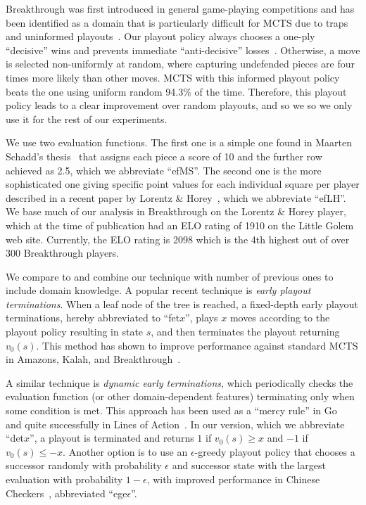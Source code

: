 \documentclass[conference]{IEEEtran}
\begin{document}
Breakthrough was first introduced in general game-playing competitions and has been identified as a domain 
that is particularly difficult for MCTS due to traps and uninformed playouts~\cite{Gudmindsson13Sufficiency}. 
Our playout policy always chooses a one-ply ``decisive'' wins and prevents immediate ``anti-decisive'' 
losses~\cite{Teytaud10On}.
Otherwise, a move is selected non-uniformly at random, where capturing undefended pieces are four times more
likely than other moves. 
MCTS with this informed playout policy beats the one using uniform random 94.3\% of the time. Therefore, this 
playout policy leads to a clear improvement over random playouts, and so we so we only use it for the rest 
of our experiments. 

We use two evaluation functions. The first one is a simple one found in Maarten Schadd's thesis~\cite{Schadd11PhdThesis} 
that assigns each piece a score of 10 and the further row achieved as 2.5, which we abbreviate ``efMS''. The second 
one is the more sophisticated one giving specific point values for each individual square per player 
described in a recent paper by Lorentz \& Horey~\cite{Lorentz13Breakthrough}, which we abbreviate ``efLH''. 
We base much of our analysis in Breakthrough on the Lorentz \& Horey player, which 
at the time of publication had an ELO rating of 1910 on the Little Golem web site. 
Currently, the ELO rating is 2098 which is the 4th highest out of over 300 Breakthrough players. 

We compare to and combine our technique with number of previous ones to include  
domain knowledge. A popular recent technique is {\it early playout terminations}. When a leaf node of the tree 
is reached, a fixed-depth early playout terminations, hereby abbreviated to ``fet$x$'', plays $x$ moves according
to the playout policy resulting in state $s$, and then terminates the playout returning $v_0(s)$. This method has
shown to improve performance against standard MCTS in Amazons, Kalah, and 
Breakthrough~\cite{Lorentz08Amazons,Ramanujan11Tradeoffs,Lorentz13Breakthrough}. 

A similar technique is {\it dynamic early terminations}, which periodically checks the evaluation function 
(or other domain-dependent features) terminating only when some condition is met. 
This approach has been used as a ``mercy rule'' in Go~\cite{Bouzy07Old} and quite successfully in 
Lines of Action~\cite{Winands08MCTSSolver}.
In our version, which we abbreviate ``det$x$'', a playout is terminated and returns $1$ if $v_0(s) \ge x$ and 
$-1$ if $v_0(s) \le -x$. Another option is to use an $\epsilon$-greedy playout policy that chooses a successor randomly 
with probability $\epsilon$ and successor state with the largest evaluation with probability $1-\epsilon$, with 
improved performance in Chinese Checkers~\cite{Sturtevant08An,Nijssen12Playout}, abbreviated ``ege$\epsilon$''.
\end{document}

